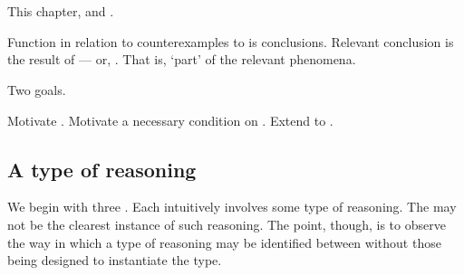 \chapter{}
\label{cha:typical}

\begin{note}
  This chapter, \tR{} and \tC{}.

  Function in relation to counterexamples to \issueConstraint{} is conclusions.
  Relevant conclusion is the result of \tR{} --- or, \tR[concluding]{}.
  That is, `part' of the relevant phenomena.

  Two goals.

  Motivate \tR{}.
  Motivate a necessary condition on \tR{}.
  Extend to \tC{}.
\end{note}

\begin{note}
  \begin{TOCEnum}
  \item
  \item
  \item
  \end{TOCEnum}
\end{note}

\section{A type of reasoning}
\label{cha:typical:sec:g-s}

\begin{note}
  We begin with three .
  Each  intuitively involves some type of reasoning.
  The  may not be the clearest instance of such reasoning.
  The point, though, is to observe the way in which a type of reasoning may be identified between  without those  being designed to instantiate the type.
\end{note}

